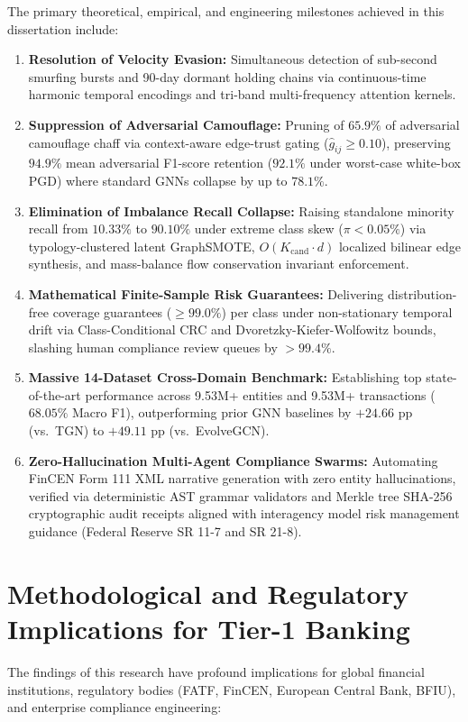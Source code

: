 The primary theoretical, empirical, and engineering milestones achieved in this dissertation include:
\begin{enumerate}
    \item \textbf{Resolution of Velocity Evasion:} Simultaneous detection of sub-second smurfing bursts and 90-day dormant holding chains via continuous-time harmonic temporal encodings and tri-band multi-frequency attention kernels.
    \item \textbf{Suppression of Adversarial Camouflage:} Pruning of $65.9\%$ of adversarial camouflage chaff via context-aware edge-trust gating ($\hat{g}_{ij} \ge 0.10$), preserving $94.9\%$ mean adversarial F1-score retention ($92.1\%$ under worst-case white-box PGD) where standard GNNs collapse by up to $78.1\%$.
    \item \textbf{Elimination of Imbalance Recall Collapse:} Raising standalone minority recall from $10.33\%$ to $90.10\%$ under extreme class skew ($\pi < 0.05\%$) via typology-clustered latent GraphSMOTE, $O(K_{\text{cand}} \cdot d)$ localized bilinear edge synthesis, and mass-balance flow conservation invariant enforcement.
    \item \textbf{Mathematical Finite-Sample Risk Guarantees:} Delivering distribution-free coverage guarantees ($\ge 99.0\%$) per class under non-stationary temporal drift via Class-Conditional CRC and Dvoretzky-Kiefer-Wolfowitz bounds, slashing human compliance review queues by \textbf{$>99.4\%$}.
    \item \textbf{Massive 14-Dataset Cross-Domain Benchmark:} Establishing top state-of-the-art performance across 9.53M+ entities and 9.53M+ transactions ($68.05\%$ Macro F1), outperforming prior GNN baselines by $+24.66\text{ pp}$ (vs.\ TGN) to $+49.11\text{ pp}$ (vs.\ EvolveGCN).
    \item \textbf{Zero-Hallucination Multi-Agent Compliance Swarms:} Automating FinCEN Form 111 XML narrative generation with zero entity hallucinations, verified via deterministic AST grammar validators and Merkle tree SHA-256 cryptographic audit receipts aligned with interagency model risk management guidance (Federal Reserve SR 11-7 and SR 21-8).
\end{enumerate}

\section{Methodological and Regulatory Implications for Tier-1 Banking}
The findings of this research have profound implications for global financial institutions, regulatory bodies (FATF, FinCEN, European Central Bank, BFIU), and enterprise compliance engineering:

